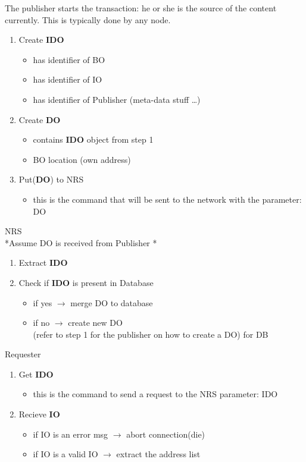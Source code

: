 \documentclass[11pt]{article}
\begin{document}
 The publisher starts the transaction: he or she is the source of the content currently. This is typically done by any node. 
\begin{enumerate}
  \item Create {\bf IDO}
  	\begin{itemize}
  	\item has identifier of BO
  	\item has identifier of IO
  	\item has identifier of Publisher (meta-data stuff \ldots)
  	\end{itemize}
  	\newpage
  \item Create {\bf DO}
  \begin{itemize}
  	\item contains {\bf IDO } object from step 1
  	\item BO location (own address)
  	\end{itemize}
  \item Put({\bf DO}) to NRS
  \begin{itemize}
  	\item this is the command that will be sent to the network with the parameter: DO
  	\end{itemize}
\end{enumerate}
 \newpage
NRS\\
*Assume DO is received from Publisher *
\begin{enumerate}
  \item Extract {\bf IDO}
  \item Check if {\bf IDO} is present in Database
  \begin{itemize}
  	\item if yes $\rightarrow$ merge DO to database
  	\item if no $\rightarrow$ create new DO\\(refer to step 1 for the publisher on how to create a DO) for DB
  	\end{itemize}
\end{enumerate}

Requester
\begin{enumerate}
  \item Get {\bf IDO}
  	\begin{itemize}
  	\item this is the command to send a request to the NRS parameter: IDO
  	\end{itemize}
  \item Recieve  {\bf IO}
  \begin{itemize}
  	\item if IO is an error msg $\rightarrow$ abort connection(die)
  	\item if IO is a valid IO $\rightarrow$ extract the address list
  	\end{itemize}
\end{enumerate}
\end{document}
